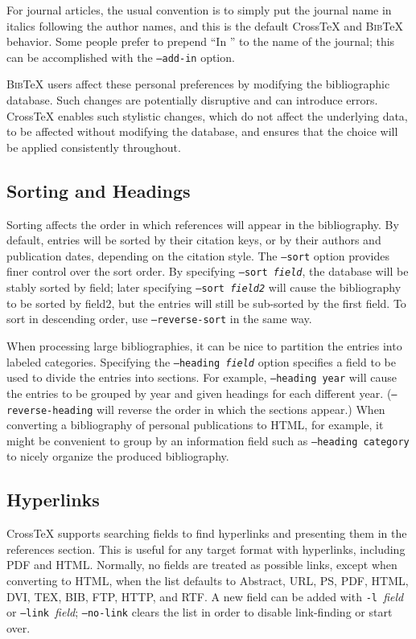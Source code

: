 \documentclass{article}
\newcommand{\XTX}{Cross\TeX}
\newcommand{\BibTeX}{\textsc{Bib}\TeX}
\begin{document}
For journal articles, the usual convention is to simply put the journal
name in italics following the author names, and this is the default \XTX{}
and \BibTeX{} behavior. Some people prefer to prepend ``In '' to the
name of the journal; this can be accomplished with the \texttt{--add-in}
option.

\BibTeX{} users affect these personal preferences by modifying the
bibliographic database. Such changes are potentially disruptive and can
introduce errors.  \XTX{} enables such stylistic changes, which do not
affect the underlying data, to be affected without modifying the database,
and ensures that the choice will be applied consistently throughout.

\subsection{Sorting and Headings}

Sorting affects the order in which references will appear in the
bibliography.  By default, entries will be sorted by their citation keys,
or by their authors and publication dates, depending on the citation
style.  The \texttt{--sort} option provides finer control over the
sort order. By specifying \texttt{--sort \textrm{\textit{field}}}, the
database will be stably sorted by field; later specifying \texttt{--sort
\textrm{\textit{field2}}} will cause the bibliography to be sorted by
field2, but the entries will still be sub-sorted by the first field. To
sort in descending order, use \texttt{--reverse-sort} in the same way.

When processing large bibliographies, it can be nice to partition
the entries into labeled categories. Specifying the \texttt{--heading
\textrm{\textit{field}}} option specifies a field to be used to divide
the entries into sections. For example, \texttt{--heading year} will
cause the entries to be grouped by year and given headings for each
different year. (\texttt{--reverse-heading} will reverse the order in
which the sections appear.) When converting a bibliography of personal
publications to HTML, for example, it might be convenient to group by an
information field such as \texttt{--heading category} to nicely organize
the produced bibliography.

\subsection{Hyperlinks}

\XTX{} supports searching fields to find hyperlinks and presenting them
in the references section.  This is useful for any target format with
hyperlinks, including PDF and HTML.  Normally, no fields are treated
as possible links, except when converting to HTML, when the list
defaults to Abstract, URL, PS, PDF, HTML, DVI, TEX, BIB, FTP, HTTP,
and RTF.  A new field can be added with \texttt{-l~}\textit{field} or
\texttt{--link~}\textit{field}; \texttt{--no-link} clears the list in
order to disable link-finding or start over.
\end{document}
